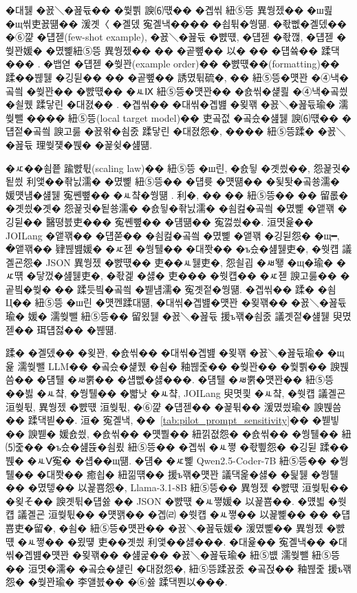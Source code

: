 \documentclass[10pt,twocolumn]{article}
\begin{document}
�대뒗 �꾨＼�꾪듃�� �쒗쁽 諛⑹떇�� �곕씪 紐⑤뜽 異쒕젰�� �ш쾶 �щ씪吏꾨떎�� 湲곗〈 �곌뎄 寃곌낵���� �쇱튂�쒕떎. �좏뻾�곌뎄�� �⑥꺑 �덉젣(few-shot example), �꾨＼�꾪듃 �뺤떇, �덉젣 �좏깮, �덉젣 �쒖꽌媛� �몄뼱紐⑤뜽 異쒕젰�� �� �곹뼢�� 以� �� �덉쓬�� 蹂댁��� \cite{REF_ZHAO_CALIBRATE}. �뱁엳 �덉젣 �쒖꽌(example order)�� �뺤떇��(formatting)�� 蹂��붾뒗 �깅뒫�� �� �곹뼢�� 誘몄튂硫�, �� 紐⑤뜽�먯꽌 �④낵�곸씤 �쒖꽌�� �뺤떇�� �ㅻⅨ 紐⑤뜽�먯꽌�� �숈씪�섍쾶 �④낵�곸씠�쇨퀬 蹂닿린 �대졄�� \cite{REF_PROMPT_ORDER,REF_PROMPT_FORMAT_SENSITIVITY}. �곕씪�� �대씪�곕뱶 �묒꽦 �꾨＼�꾪듃瑜� 濡쒖뺄 ���� 紐⑤뜽(local target model)�� 吏곸젒 �곸슜�섎뒗 諛⑹떇�� �덉젙�곸씤 諛고룷 �꾨왂�쇰줈 蹂닿린 �대졄怨�, ���� 紐⑤뜽蹂� �꾨＼�꾪듃 理쒖쟻�붽� �꾩슂�섎떎.

�ㅼ��쇰쭅 踰뺤튃(scaling law)�� 紐⑤뜽 �ш린, �숈뒿 �곗씠��, 怨꾩궛�됱씠 利앷��좎닔濡� �몄뼱 紐⑤뜽�� �덉륫 �먯떎�� �됯퇏�곸쑝濡� 媛먯냼�섎뒗 寃쏀뼢�� �ㅻ챸�쒕떎 \cite{REF_SCALING_LAWS,REF_CHINCHILLA}. 利�, �� �� 紐⑤뜽�� �� 留롮� �곗씠�곗� 怨꾩궛�됱쑝濡� �숈뒿�좎닔濡� �쇰컲�곸씤 �몄뼱 �앹꽦 �깅뒫�� 醫뗭븘吏��� 寃쏀뼢�� �덈떎�� 寃껋씠��. 洹몃윭�� JOILang �앹꽦�� �덉쭏�� �쇰컲�곸씤 �몄뼱 �앹꽦 �깅뒫怨� �щ━, �앹꽦�� 肄붾뱶媛� �ㅼ젣 �쒕퉬�� �대쫫�� �ъ슜�섎뒗吏�, �쒓컙 議곌굔怨� JSON 異쒕젰 �뺤떇�� 吏��ㅻ뒗吏�, 怨쇨굅 �ㅽ뙣 �щ�瑜� �ㅼ떆 �닿껐�섎뒗吏�, �좏겙 �섏� 吏��� �쒓컙�� �ㅼ젣 諛고룷�� �곹빀�쒖� �� 蹂듯빀�곸씤 �붿냼濡� 寃곗젙�쒕떎. �곕씪�� 蹂� �쇰Ц�� 紐⑤뜽 �ш린 �먯껜蹂대떎, �대씪�곕뱶�먯꽌 �묒꽦�� �꾨＼�꾪듃瑜� 媛� 濡쒖뺄 紐⑤뜽�� 留욌뒗 �꾨＼�꾪듃 援ъ꽦�쇰줈 議곗젙�섎뒗 臾몄젣�� 珥덉젏�� �붾떎.

蹂� �곌뎄�� �욎꽌, �숈씪�� �대씪�곕뱶 �묒꽦 �꾨＼�꾪듃瑜� �щ윭 濡쒖뺄 LLM�� �곸슜�섍퀬 �쇰� 釉붾줉�� �쒖꽌�� �쒗쁽�� 諛붽씀�� �덈퉬 �ㅽ뿕�� �섑뻾�섏���. �덈퉬 �ㅽ뿕�먯꽌�� 紐⑤뜽 ��븷 �ㅻ챸, �쒕퉬�� �뺣낫 �ㅻ챸, JOILang 臾몃쾿 �ㅻ챸, �쒓컙 議곌굔 洹쒖튃, 異쒕젰 �뺤떇 洹쒖튃, �⑥꺑 �덉젣�� �꾩튂�� 湲몄씠瑜� 諛붽씀�� 蹂댁븯��. 洹� 寃곌낵, ��~\ref{tab:pilot_prompt_sensitivity}�� �붿빟�� 諛붿� 媛숈씠, �숈씪�� �먯뿰�� 紐낅졊怨� �숈씪�� �쒕퉬�� 紐⑸줉�� �ъ슜�섎뜑�쇰룄 紐⑤뜽�� �곕씪 �ㅻ쪟 �좏삎怨� �깅뒫 蹂��붽� �ㅻⅤ寃� �섑��щ떎. �덈� �ㅼ뼱 Qwen2.5-Coder-7B 紐⑤뜽�� �쒕퉬�� �대쫫�� 癒쇱� 紐낆떆�� 援ъ꽦�먯꽌 議댁옱�섏� �딅뒗 �쒕퉬�� �몄텧�� 以꾩뿀怨�, Llama-3.1-8B 紐⑤뜽�� 異쒕젰 �뺤떇 洹쒖튃�� �욎そ�� 諛곗튂�덉쓣 �� JSON �뺤떇 �ㅻ쪟媛� 以꾩뿀��. �먰븳 �쒓컙 議곌굔 洹쒖튃�� �먯꽭�� �곕㈃ �쒓컙 �ㅻ쪟�� 以꾩뼱�� �� �덉뿀吏�留�, �쇰� 紐⑤뜽�먯꽌�� �꾨＼�꾪듃媛� 湲몄뼱�� 異쒕젰 �뺤떇 �ㅻ쪟�� �묐떟 吏��곗씠 利앷��섏���. �대윭�� 寃곌낵�� �대씪�곕뱶�먯꽌 �묒꽦�� �섎굹�� �꾨＼�꾪듃瑜� 紐⑤뱺 濡쒖뺄 紐⑤뜽�� 洹몃�濡� �곸슜�섍린 �대졄怨�, 紐⑤뜽蹂꾨줈 �곸젅�� 釉붾줉 援ъ꽦怨� �쒖꽌瑜� 李얠븘�� �⑥쓣 蹂댁뿬以���.
\end{document}
